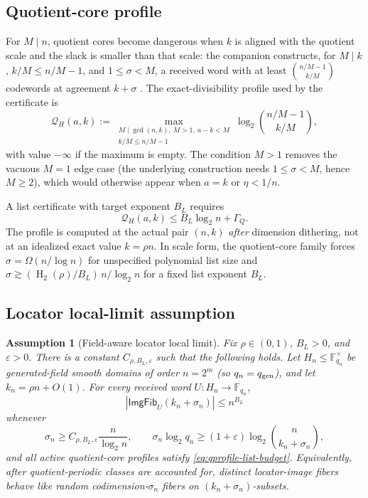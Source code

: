 \documentclass[11pt]{article}
\newtheorem{assumption}[theorem]{Assumption}
\theoremstyle{definition}
\newcommand{\F}{\mathbb F}
\newcommand{\eps}{\varepsilon}
\newcommand{\Hbin}{\operatorname{H}_2}
\newcommand{\Qprof}{\mathcal Q}
\newcommand{\qgen}{q_{\rm gen}}
\newcommand{\ImgFib}{\mathsf{ImgFib}}
\begin{document}
\subsection{Quotient-core profile}
\label{sec:qprofile}

For $M\mid n$, quotient cores become dangerous when $k$ is aligned with the quotient scale and the slack is smaller than that scale: the companion constructs, for $M\mid k$, $k/M\le n/M-1$, and $1\le\sigma<M$, a received word with at least $\binom{n/M-1}{k/M}$ codewords at agreement $k+\sigma$ \cite[Thm.~3.5]{SlackMCAEntropyMerged}.  The exact-divisibility profile used by the certificate is
\begin{equation}
\label{eq:qprofile}
        \Qprof_H(a,k)
        :=
        \max_{\substack{M\mid\gcd(n,k),\ M>1,\ a-k<M\\ k/M\le n/M-1}}
        \log_2\binom{n/M-1}{k/M},
\end{equation}
with value $-\infty$ if the maximum is empty.  The condition $M>1$ removes the vacuous $M=1$ edge case (the underlying construction needs $1\le\sigma<M$, hence $M\ge2$), which would otherwise appear when $a=k$ or $\eta<1/n$.

A list certificate with target exponent $B_L$ requires
\begin{equation}
\label{eq:qprofile-list-budget}
        \Qprof_H(a,k)\le B_L\log_2n+\Gamma_Q .
\end{equation}
The profile is computed at the actual pair $(n,k)$ \emph{after} dimension dithering, not at an idealized exact value $k=\rho n$.  In scale form, the quotient-core family forces $\sigma=\Omega(n/\log n)$ for unspecified polynomial list size and $\sigma\gtrsim(\Hbin(\rho)/B_L)\,n/\log_2n$ for a fixed list exponent $B_L$.

\subsection{Locator local-limit assumption}
\label{sec:locator}

\begin{assumption}[Field-aware locator local limit]
\label{ass:locator}
Fix $\rho\in(0,1)$, $B_L>0$, and $\eps>0$.  There is a constant $C_{\rho,B_L,\eps}$ such that the following holds.  Let $H_n\le\F_{q_n}^{\times}$ be generated-field smooth domains of order $n=2^m$ (so $q_n=\qgen$), and let $k_n=\rho n+O(1)$.  For every received word $U:H_n\to\F_{q_n}$,
\[
        |\ImgFib_U(k_n+\sigma_n)|\le n^{B_L}
\]
whenever
\[
        \sigma_n\ge C_{\rho,B_L,\eps}\frac n{\log_2 n},
        \qquad
        \sigma_n\log_2 q_n
        \ge (1+\eps)\log_2\binom n{k_n+\sigma_n},
\]
and all active quotient-core profiles satisfy \eqref{eq:qprofile-list-budget}.  Equivalently, after quotient-periodic classes are accounted for, distinct locator-image fibers behave like random codimension-$\sigma_n$ fibers on $(k_n+\sigma_n)$-subsets.
\end{assumption}
\end{document}
